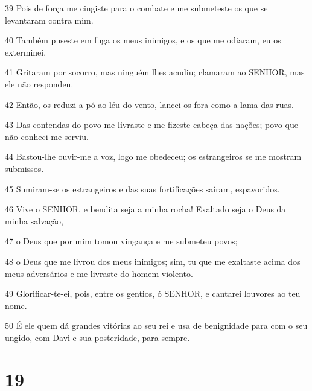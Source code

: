 \par 39 Pois de força me cingiste para o combate e me submeteste os que se levantaram contra mim.
\par 40 Também puseste em fuga os meus inimigos, e os que me odiaram, eu os exterminei.
\par 41 Gritaram por socorro, mas ninguém lhes acudiu; clamaram ao SENHOR, mas ele não respondeu.
\par 42 Então, os reduzi a pó ao léu do vento, lancei-os fora como a lama das ruas.
\par 43 Das contendas do povo me livraste e me fizeste cabeça das nações; povo que não conheci me serviu.
\par 44 Bastou-lhe ouvir-me a voz, logo me obedeceu; os estrangeiros se me mostram submissos.
\par 45 Sumiram-se os estrangeiros e das suas fortificações saíram, espavoridos.
\par 46 Vive o SENHOR, e bendita seja a minha rocha! Exaltado seja o Deus da minha salvação,
\par 47 o Deus que por mim tomou vingança e me submeteu povos;
\par 48 o Deus que me livrou dos meus inimigos; sim, tu que me exaltaste acima dos meus adversários e me livraste do homem violento.
\par 49 Glorificar-te-ei, pois, entre os gentios, ó SENHOR, e cantarei louvores ao teu nome.
\par 50 É ele quem dá grandes vitórias ao seu rei e usa de benignidade para com o seu ungido, com Davi e sua posteridade, para sempre.

\chapter{19}

